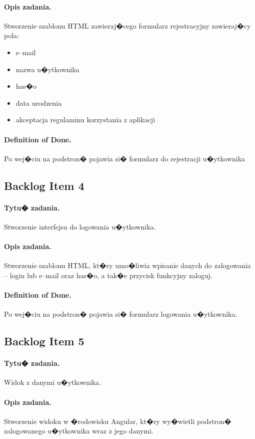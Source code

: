 ﻿\documentclass[a4paper]{article}
\begin{document}
\paragraph{Opis zadania.} Stworzenie szablonu HTML zawieraj�cego formularz rejestracyjny zawieraj�cy pola: 
\begin{itemize}
\item e--mail
\item nazwa u�ytkownika
\item has�o
\item data urodzenia
\item akceptacja regulaminu korzystania z aplikacji
\end{itemize}
\paragraph{Definition of Done.} Po wej�ciu na podstron� pojawia si� formularz do rejestracji u�ytkownika

 
\subsection{Backlog Item 4} 
\paragraph{Tytu� zadania.} Stworzenie interfejsu do logowania u�ytkownika.
\paragraph{Opis zadania.} Stworzenie szablonu HTML, kt�ry umo�liwia wpisanie danych do zalogowania -- login lub e--mail oraz has�o, a tak�e przycisk funkcyjny zaloguj.
\paragraph{Definition of Done.} Po wej�ciu na podstron� pojawia si� formularz logowania u�ytkownika.

\subsection{Backlog Item 5} 
\paragraph{Tytu� zadania.} Widok z danymi u�ytkownika.
\paragraph{Opis zadania.} Stworzenie widoku w �rodowisku Angular, kt�ry wy�wietli podstron� zalogowanego u�ytkownika wraz z jego danymi.
\end{document}
